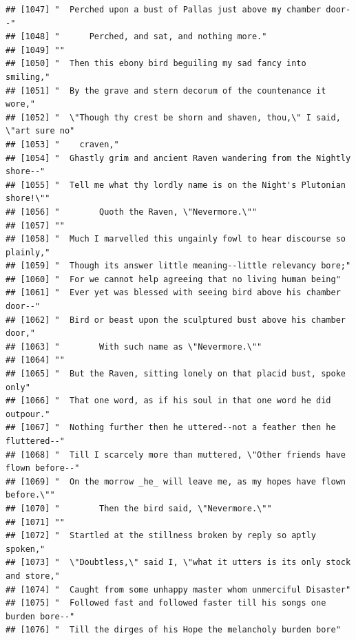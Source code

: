 \documentclass{article}\usepackage[]{graphicx}\usepackage[]{color}
\makeatletter
\newenvironment{kframe}{%
 \def\at@end@of@kframe{}%
 \ifinner\ifhmode%
  \def\at@end@of@kframe{\end{minipage}}%
  \begin{minipage}{\columnwidth}%
 \fi\fi%
 \def\FrameCommand##1{\hskip\@totalleftmargin \hskip-\fboxsep
 \colorbox{shadecolor}{##1}\hskip-\fboxsep
     \hskip-\linewidth \hskip-\@totalleftmargin \hskip\columnwidth}%
 \MakeFramed {\advance\hsize-\width
   \@totalleftmargin\z@ \linewidth\hsize
   \@setminipage}}%
 {\par\unskip\endMakeFramed%
 \at@end@of@kframe}
\newenvironment{knitrout}{}{} %
\makeatother
\begin{document}
\begin{knitrout}
\begin{kframe}
\begin{verbatim}
## [1047] "  Perched upon a bust of Pallas just above my chamber door--"                
## [1048] "      Perched, and sat, and nothing more."                                   
## [1049] ""                                                                            
## [1050] "  Then this ebony bird beguiling my sad fancy into smiling,"                 
## [1051] "  By the grave and stern decorum of the countenance it wore,"                
## [1052] "  \"Though thy crest be shorn and shaven, thou,\" I said, \"art sure no"     
## [1053] "    craven,"                                                                 
## [1054] "  Ghastly grim and ancient Raven wandering from the Nightly shore--"         
## [1055] "  Tell me what thy lordly name is on the Night's Plutonian shore!\""         
## [1056] "        Quoth the Raven, \"Nevermore.\""                                     
## [1057] ""                                                                            
## [1058] "  Much I marvelled this ungainly fowl to hear discourse so plainly,"         
## [1059] "  Though its answer little meaning--little relevancy bore;"                  
## [1060] "  For we cannot help agreeing that no living human being"                    
## [1061] "  Ever yet was blessed with seeing bird above his chamber door--"            
## [1062] "  Bird or beast upon the sculptured bust above his chamber door,"            
## [1063] "        With such name as \"Nevermore.\""                                    
## [1064] ""                                                                            
## [1065] "  But the Raven, sitting lonely on that placid bust, spoke only"             
## [1066] "  That one word, as if his soul in that one word he did outpour."            
## [1067] "  Nothing further then he uttered--not a feather then he fluttered--"        
## [1068] "  Till I scarcely more than muttered, \"Other friends have flown before--"   
## [1069] "  On the morrow _he_ will leave me, as my hopes have flown before.\""        
## [1070] "        Then the bird said, \"Nevermore.\""                                  
## [1071] ""                                                                            
## [1072] "  Startled at the stillness broken by reply so aptly spoken,"                
## [1073] "  \"Doubtless,\" said I, \"what it utters is its only stock and store,"      
## [1074] "  Caught from some unhappy master whom unmerciful Disaster"                  
## [1075] "  Followed fast and followed faster till his songs one burden bore--"        
## [1076] "  Till the dirges of his Hope the melancholy burden bore"                    

\end{verbatim}
\end{kframe}
\end{knitrout}
\end{document}
